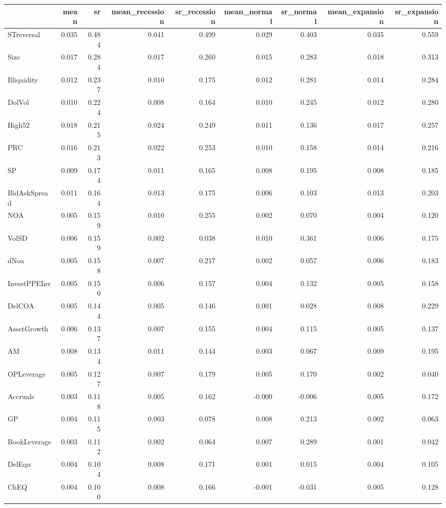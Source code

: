 \begin{tabular}{lrrrrrrrr}
\toprule
 & mean & sr & mean_recession & sr_recession & mean_normal & sr_normal & mean_expansion & sr_expansion \\
\midrule
STreversal & 0.035 & 0.484 & 0.041 & 0.499 & 0.029 & 0.403 & 0.035 & 0.559 \\
Size & 0.017 & 0.284 & 0.017 & 0.260 & 0.015 & 0.283 & 0.018 & 0.313 \\
Illiquidity & 0.012 & 0.237 & 0.010 & 0.175 & 0.012 & 0.281 & 0.014 & 0.284 \\
DolVol & 0.010 & 0.224 & 0.008 & 0.164 & 0.010 & 0.245 & 0.012 & 0.280 \\
High52 & 0.018 & 0.215 & 0.024 & 0.249 & 0.011 & 0.136 & 0.017 & 0.257 \\
PRC & 0.016 & 0.213 & 0.022 & 0.253 & 0.010 & 0.158 & 0.014 & 0.216 \\
SP & 0.009 & 0.174 & 0.011 & 0.165 & 0.008 & 0.195 & 0.008 & 0.185 \\
BidAskSpread & 0.011 & 0.164 & 0.013 & 0.175 & 0.006 & 0.103 & 0.013 & 0.203 \\
NOA & 0.005 & 0.159 & 0.010 & 0.255 & 0.002 & 0.070 & 0.004 & 0.120 \\
VolSD & 0.006 & 0.159 & 0.002 & 0.038 & 0.010 & 0.361 & 0.006 & 0.175 \\
dNoa & 0.005 & 0.158 & 0.007 & 0.217 & 0.002 & 0.057 & 0.006 & 0.183 \\
InvestPPEInv & 0.005 & 0.150 & 0.006 & 0.157 & 0.004 & 0.132 & 0.005 & 0.158 \\
DelCOA & 0.005 & 0.144 & 0.005 & 0.146 & 0.001 & 0.028 & 0.008 & 0.229 \\
AssetGrowth & 0.006 & 0.137 & 0.007 & 0.155 & 0.004 & 0.115 & 0.005 & 0.137 \\
AM & 0.008 & 0.134 & 0.011 & 0.144 & 0.003 & 0.067 & 0.009 & 0.195 \\
OPLeverage & 0.005 & 0.127 & 0.007 & 0.179 & 0.005 & 0.170 & 0.002 & 0.040 \\
Accruals & 0.003 & 0.118 & 0.005 & 0.162 & -0.000 & -0.006 & 0.005 & 0.172 \\
GP & 0.004 & 0.115 & 0.003 & 0.078 & 0.008 & 0.213 & 0.002 & 0.063 \\
BookLeverage & 0.003 & 0.112 & 0.002 & 0.064 & 0.007 & 0.289 & 0.001 & 0.042 \\
DelEqu & 0.004 & 0.104 & 0.008 & 0.171 & 0.001 & 0.015 & 0.004 & 0.105 \\
ChEQ & 0.004 & 0.100 & 0.008 & 0.166 & -0.001 & -0.031 & 0.005 & 0.128 \\

\end{tabular}
